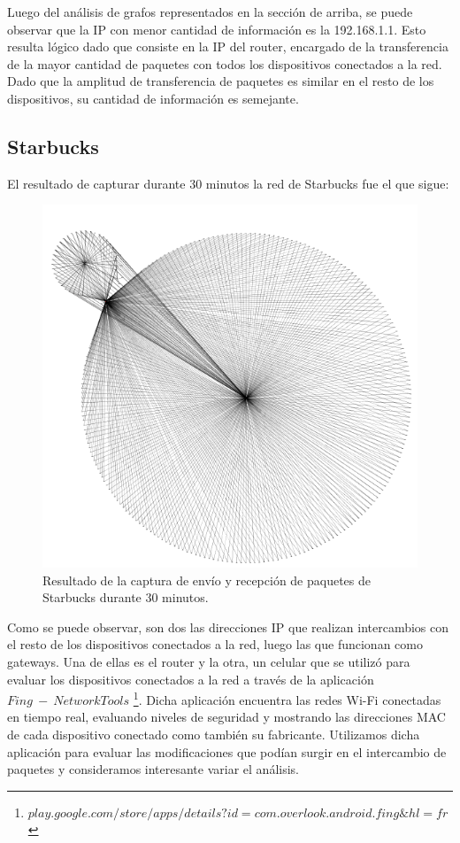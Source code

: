 \documentclass[10pt, a4paper]{article}
\begin{document}
Luego del análisis de grafos representados en la sección de arriba, se puede observar que la IP con menor cantidad de información es la 192.168.1.1. Esto resulta lógico dado que consiste en la IP del router, encargado de la transferencia de la mayor cantidad de paquetes con todos los dispositivos conectados a la red. Dado que la amplitud de transferencia de paquetes es similar en el resto de los dispositivos, su cantidad de información es semejante.

\subsection{Starbucks}

 El resultado de capturar durante 30 minutos la red de Starbucks fue el que sigue:

\begin{figure}[H] %
\begin{center}
\includegraphics[width=450pt]{../imgs/starbucks30_entero.png}
\caption{Resultado de la captura de envío y recepción de paquetes de Starbucks durante 30 minutos.}
\end{center}
\end{figure}

Como se puede observar, son dos las direcciones IP que realizan intercambios con el resto de los dispositivos conectados a la red, luego las que funcionan como gateways. Una de ellas es el router y la otra, un celular que se utilizó para evaluar los dispositivos conectados a la red a través de la aplicación $Fing\ -\ Network Tools$ \footnote{$play.google.com/store/apps/details?id=com.overlook.android.fing\&hl=fr$}. Dicha aplicación encuentra las redes Wi-Fi conectadas en tiempo real, evaluando niveles de seguridad y mostrando las direcciones MAC de cada dispositivo conectado como también su fabricante. Utilizamos dicha aplicación para evaluar las modificaciones que podían surgir en el intercambio de paquetes y consideramos interesante variar el análisis.
\end{document}
